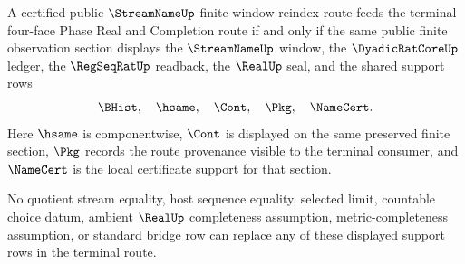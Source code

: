 \begin{theorem}
\label{thm:streamname-reindex-support-row-necessity}
A certified public $\StreamNameUp$ finite-window reindex route feeds the
terminal four-face Phase Real and Completion route if and only if the same
public finite observation section displays the $\StreamNameUp$ window, the
$\DyadicRatCoreUp$ ledger, the $\RegSeqRatUp$ readback, the $\RealUp$ seal,
and the shared support rows
$$
\BHist,\quad \hsame,\quad \Cont,\quad \Pkg,\quad \NameCert.
$$
Here $\hsame$ is componentwise, $\Cont$ is displayed on the same preserved
finite section, $\Pkg$ records the route provenance visible to the terminal
consumer, and $\NameCert$ is the local certificate support for that section.

No quotient stream equality, host sequence equality, selected limit, countable
choice datum, ambient $\RealUp$ completeness assumption, metric-completeness
assumption, or standard bridge row can replace any of these displayed support
rows in the terminal route.
\end{theorem}
